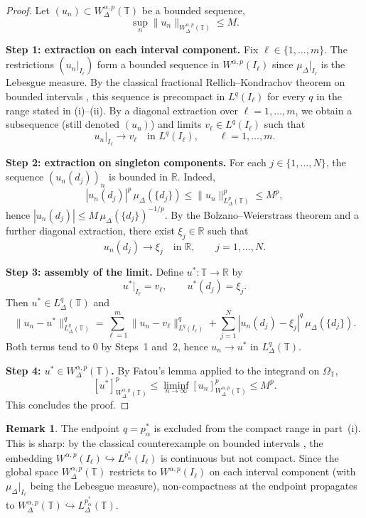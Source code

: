 \documentclass[11pt,a4paper]{article}
\numberwithin{equation}{section}
\theoremstyle{definition}
\newtheorem{remark}[remark]{Remark}
\newcommand{\T}{\mathbb{T}}
\begin{document}
\begin{proof}
Let $(u_n) \subset W^{\alpha,p}_\Delta(\mathbb{T})$ be a bounded sequence,
\[
\sup_n \|u_n\|_{W^{\alpha,p}_\Delta(\mathbb{T})} \le M.
\]

\smallskip
\noindent\textbf{Step 1: extraction on each interval component.} Fix 
$\ell \in \{1, \dots, m\}$. The restrictions $(u_n|_{I_\ell})$ form a bounded 
sequence in $W^{\alpha,p}(I_\ell)$ since $\mu_\Delta|_{I_\ell}$ is the 
Lebesgue measure. By the classical fractional Rellich--Kondrachov theorem 
on bounded intervals \cite[Corollary 7.2]{DiNezzaPalatucciValdinoci2012}, this 
sequence is precompact in $L^q(I_\ell)$ for every $q$ in the range stated 
in (i)--(ii). By a diagonal extraction over $\ell = 1, \dots, m$, we obtain 
a subsequence (still denoted $(u_n)$) and limits $v_\ell \in L^q(I_\ell)$ 
such that
\[
u_n|_{I_\ell} \to v_\ell \quad \text{in } L^q(I_\ell), \qquad \ell = 1, \dots, m.
\]

\smallskip
\noindent\textbf{Step 2: extraction on singleton components.} For each 
$j \in \{1, \dots, N\}$, the sequence $(u_n(d_j))_n$ is bounded in $\mathbb{R}$. 
Indeed,
\[
|u_n(d_j)|^p \, \mu_\Delta(\{d_j\}) 
\le \|u_n\|^p_{L^p_\Delta(\mathbb{T})} \le M^p,
\]
hence $|u_n(d_j)| \le M \, \mu_\Delta(\{d_j\})^{-1/p}$. By the Bolzano--Weierstrass 
theorem and a further diagonal extraction, there exist $\xi_j \in \mathbb{R}$ such that
\[
u_n(d_j) \to \xi_j \quad \text{in } \mathbb{R}, \qquad j = 1, \dots, N.
\]

\smallskip
\noindent\textbf{Step 3: assembly of the limit.} Define $u^* : \mathbb{T} \to \mathbb{R}$ by
\[
u^*|_{I_\ell} = v_\ell, \qquad u^*(d_j) = \xi_j.
\]
Then $u^* \in L^q_\Delta(\mathbb{T})$ and
\[
\|u_n - u^*\|^q_{L^q_\Delta(\mathbb{T})} 
= \sum_{\ell=1}^m \|u_n - v_\ell\|^q_{L^q(I_\ell)} 
+ \sum_{j=1}^N |u_n(d_j) - \xi_j|^q \, \mu_\Delta(\{d_j\}).
\]
Both terms tend to $0$ by Steps~1 and~2, hence $u_n \to u^*$ in $L^q_\Delta(\mathbb{T})$.

\smallskip
\noindent\textbf{Step 4: $u^* \in W^{\alpha,p}_\Delta(\mathbb{T})$.} 
By Fatou's lemma applied to the integrand on $\Omega_\mathbb{T}$,
\[
[u^*]^p_{W^{\alpha,p}_\Delta(\mathbb{T})} 
\le \liminf_{n \to \infty} [u_n]^p_{W^{\alpha,p}_\Delta(\mathbb{T})} 
\le M^p.
\]
This concludes the proof.
\end{proof}
\begin{remark}\label{rem:endpoint-noncompact}
The endpoint $q = p^*_\alpha$ is excluded from the compact range
in part~(i). This is sharp: by the classical counterexample on
bounded intervals \cite[Remark~7.3]{DiNezzaPalatucciValdinoci2012},
the embedding $W^{\alpha,p}(I_\ell)\hookrightarrow L^{p^*_\alpha}(I_\ell)$
is continuous but not compact. Since the global space
$W^{\alpha,p}_\Delta(\T)$ restricts to $W^{\alpha,p}(I_\ell)$ on
each interval component (with $\mu_\Delta|_{I_\ell}$ being the
Lebesgue measure), non-compactness at the endpoint propagates to
$W^{\alpha,p}_\Delta(\T)\hookrightarrow L^{p^*_\alpha}_\Delta(\T)$.
\end{remark}
\end{document}
